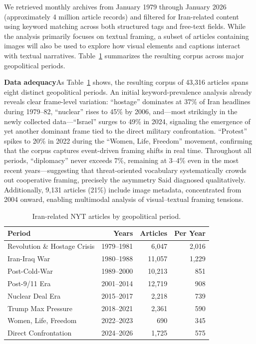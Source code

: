 \documentclass{dhnbpub}
\begin{document}
We retrieved monthly archives from January 1979 through January 2026 (approximately 4 million article records) and filtered for Iran-related content using keyword matching across both structured tags and free-text fields. While the analysis primarily focuses on textual framing, a subset of articles containing images will also be used to explore how visual elements and captions interact with textual narratives.
Table~\ref{tab:periods} summarizes the resulting corpus across major geopolitical periods.

\textbf{Data adequacy}\quad As Table~\ref{tab:periods} shows, the resulting corpus of 43,316 articles spans eight distinct geopolitical periods. An initial keyword-prevalence analysis already reveals clear frame-level variation: ``hostage'' dominates at 37\% of Iran headlines during 1979--82, ``nuclear'' rises to 45\% by 2006, and---most strikingly in the newly collected data---``Israel'' surges to 49\% in 2024, signaling the emergence of yet another dominant frame tied to the direct military confrontation. ``Protest'' spikes to 20\% in 2022 during the ``Women, Life, Freedom'' movement, confirming that the corpus captures event-driven framing shifts in real time. Throughout all periods, ``diplomacy'' never exceeds 7\%, remaining at 3--4\% even in the most recent years---suggesting that threat-oriented vocabulary systematically crowds out cooperative framing, precisely the asymmetry Said diagnosed qualitatively. Additionally, 9,131 articles (21\%) include image metadata, concentrated from 2004 onward, enabling multimodal analysis of visual--textual framing tensions.


\begin{table}[h]
  \caption{Iran-related NYT articles by geopolitical period.}
  \label{tab:periods}
  \begin{tabular}{lrrr}
    \toprule
    Period & Years & Articles & Per Year \\
    \midrule
    Revolution \& Hostage Crisis & 1979--1981 & 6,047 & 2,016 \\
    Iran-Iraq War & 1980--1988 & 11,057 & 1,229 \\
    Post-Cold-War & 1989--2000 & 10,213 & 851 \\
    Post-9/11 Era & 2001--2014 & 12,719 & 908 \\
    Nuclear Deal Era & 2015--2017 & 2,218 & 739 \\
    Trump Max Pressure & 2018--2021 & 2,361 & 590 \\
    Women, Life, Freedom & 2022--2023 & 690 & 345 \\
    Direct Confrontation & 2024--2026 & 1,725 & 575 \\
    \bottomrule
  \end{tabular}
\end{table}
\end{document}
